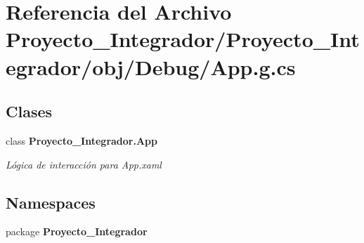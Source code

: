 \section{Referencia del Archivo Proyecto\-\_\-\-Integrador/\-Proyecto\-\_\-\-Integrador/obj/\-Debug/\-App.g.\-cs}
\label{_app_8g_8cs}
\subsection*{Clases}
\begin{DoxyCompactItemize}
\item 
class {\bf Proyecto\-\_\-\-Integrador.\-App}
\begin{DoxyCompactList}\small\item\em Lógica de interacción para App.\-xaml \end{DoxyCompactList}\end{DoxyCompactItemize}
\subsection*{Namespaces}
\begin{DoxyCompactItemize}
\item 
package {\bf Proyecto\-\_\-\-Integrador}
\end{DoxyCompactItemize}
